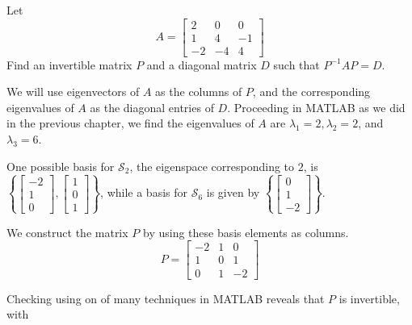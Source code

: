 \documentclass{ximera}
\begin{document}
\begin{example}\label{ex:diagonalizematrix}
  Let
  \begin{equation*}
  A=\begin{bmatrix}
  2 & 0 & 0 \\
  1 & 4 & -1 \\
  -2 & -4 & 4
  \end{bmatrix}
  \end{equation*}
   Find an invertible matrix $P$ and a diagonal matrix $D$ such that $P^{-1}AP=D$.
   
  \begin{explanation}
  We will use eigenvectors of $A$ as the columns of $P$, and
  the corresponding eigenvalues of $A$ as the diagonal entries of $D$. Proceeding in MATLAB as we did in the previous chapter, we find the eigenvalues of $A$ are $\lambda_1 =2,\lambda_2 = 2$, and $\lambda_3 = 6$. 
   
  One possible basis for $\mathcal{S}_2$, the eigenspace corresponding to $2$, is
  $\left\{
  \begin{bmatrix}
  -2 \\
  1 \\
  0
  \end{bmatrix},
  \begin{bmatrix}
  1 \\
  0 \\
  1
  \end{bmatrix}
  \right\}$,
  while a basis for $\mathcal{S}_6$ is given by
  $\left\{\begin{bmatrix}
  0 \\
  1 \\
  -2
  \end{bmatrix}\right\}$.
   
  We construct the matrix $P$ by using these basis elements as columns.
  \begin{equation*}
  P=\begin{bmatrix}
  -2 & 1 & 0 \\
  1 & 0 & 1 \\
  0 & 1 & -2
  \end{bmatrix}
  \end{equation*}
  
  Checking using on of many techniques in MATLAB reveals that $P$ is invertible, with


\end{explanation}
\end{example}
\end{document}

